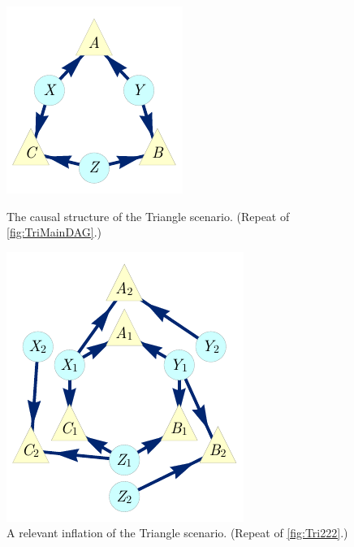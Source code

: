 \par\smallskip\nobreak
\begin{figure}[bh]
\centering
\begin{minipage}[t]{0.45\linewidth}
\centering
\includegraphics[scale=1]{TriDagRawALT.pdf}
\caption{The causal structure of the Triangle scenario. (Repeat of \cref{fig:TriMainDAG}.)}\label{fig:TriMainDAGv3}
\end{minipage}
\hfill
\begin{minipage}[t]{0.45\linewidth}
\centering
\includegraphics[scale=1]{TriDagSub222fixedcoordALT.pdf}
\caption{A relevant inflation of the Triangle scenario. (Repeat of \cref{fig:Tri222}.)}\label{fig:Tri222v2}
\end{minipage}
\end{figure}


